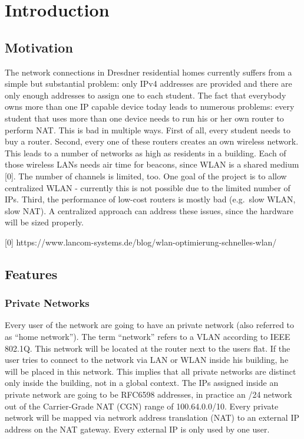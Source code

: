\section{Introduction}\label{introduction}

\subsection{Motivation}\label{motivation}

The network connections in Dresdner residential homes currently suffers
from a simple but substantial problem: only IPv4 addresses are provided
and there are only enough addresses to assign one to each student. The
fact that everybody owns more than one IP capable device today leads to
numerous problems: every student that uses more than one device needs to
run his or her own router to perform NAT. This is bad in multiple ways.
First of all, every student needs to buy a router. Second, every one of
these routers creates an own wireless network. This leads to a number of
networks as high as residents in a building. Each of those wireless LANs
needs air time for beacons, since WLAN is a shared medium {[}0{]}. The
number of channels is limited, too. One goal of the project is to allow
centralized WLAN - currently this is not possible due to the limited
number of IPs. Third, the performance of low-cost routers is mostly bad
(e.g.~slow WLAN, slow NAT). A centralized approach can address these
issues, since the hardware will be sized properly.

{[}0{]}
https://www.lancom-systems.de/blog/wlan-optimierung-schnelles-wlan/

\subsection{Features}\label{features}

\subsubsection{Private Networks}\label{private-networks}

Every user of the network are going to have an private network (also
referred to as ``home network''). The term ``network'' refers to a VLAN
according to IEEE 802.1Q. This network will be located at the router
next to the users flat. If the user tries to connect to the network via
LAN or WLAN inside his building, he will be placed in this network. This
implies that all private networks are distinct only inside the building,
not in a global context. The IPs assigned inside an private network are
going to be RFC6598 addresses, in practice an /24 network out of the
Carrier-Grade NAT (CGN) range of 100.64.0.0/10. Every private network
will be mapped via network address translation (NAT) to an external IP
address on the NAT gateway. Every external IP is only used by one user.

